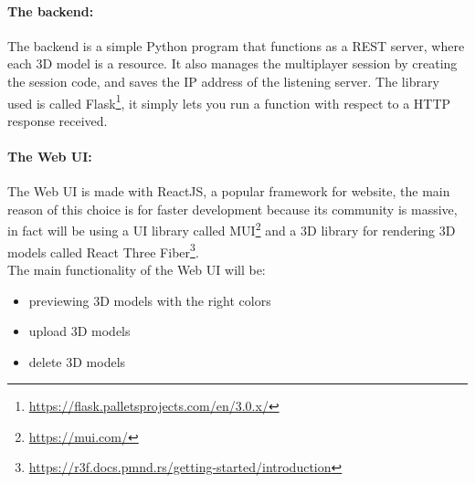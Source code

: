 \paragraph{The backend:}
The backend is a simple Python program that functions as a \ac{REST} server, where each 3D model is a resource.
It also manages the multiplayer session by creating the session code, and saves the \ac{IP} address of the listening server.
The library used is called Flask\footnote{\url{https://flask.palletsprojects.com/en/3.0.x/}}, it simply lets you run a function with respect to a \ac{HTTP} response received.

\paragraph{The Web UI:}
The Web \ac{UI} is made with ReactJS, a popular framework for website, the main reason of this choice is for faster development because its community is massive, in fact will be using a UI library called MUI\footnote{\url{https://mui.com/}}
and a 3D library for rendering 3D models called React Three Fiber\footnote{\url{https://r3f.docs.pmnd.rs/getting-started/introduction}}.\\
The main functionality of the Web \ac{UI} will be:
\begin{itemize}
  \item previewing 3D models with the right colors 
  \item upload 3D models
  \item delete 3D models
\end{itemize}


